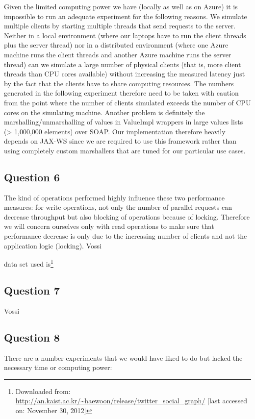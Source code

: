 \documentclass[12pt,a4paper]{article}
\begin{document}
  Given the limited computing power we have (locally as well as on Azure) it is impossible to run an adequate experiment for the following reasons. We simulate multiple clients by starting multiple threads that send requests to the server. Neither in a local environment (where our laptops have to run the client threads plus the server thread) nor in a distributed environment (where one Azure machine runs the client threads and another Azure machine runs the server thread) can we simulate a large number of physical clients (that is, more client threads than CPU cores available) without increasing the measured latency just by the fact that the clients have to share computing resources. The numbers generated in the following experiment therefore need to be taken with caution from the point where the number of clients simulated exceeds the number of CPU cores on the simulating machine. Another problem is definitely the marshalling/unmarshalling of values in ValueImpl wrappers in large values lists (> 1,000,000 elements) over SOAP. Our implementation therefore heavily depends on JAX-WS since we are required to use this framework rather than using completely custom marshallers that are tuned for our particular use cases.

\subsection*{Question 6}
\label{sec:pq6}
The kind of operations performed highly influence these two performance measures: for write operations, not only the number of parallel requests can decrease throughput but also blocking of operations because of locking. Therefore we will concern ourselves only with read operations to make sure that performance decrease is only due to the increasing number of clients and not the application logic (locking).
Vossi

data set used is\footnote{Downloaded from: \url{http://an.kaist.ac.kr/~haewoon/release/twitter_social_graph/} [last accessed on: November 30, 2012]}

\subsection*{Question 7}
\label{sec:pq7} 
Vossi

\subsection*{Question 8}
\label{sec:pq8}
There are a number experiments that we would have liked to do but lacked the necessary time or computing power:
\end{document}
